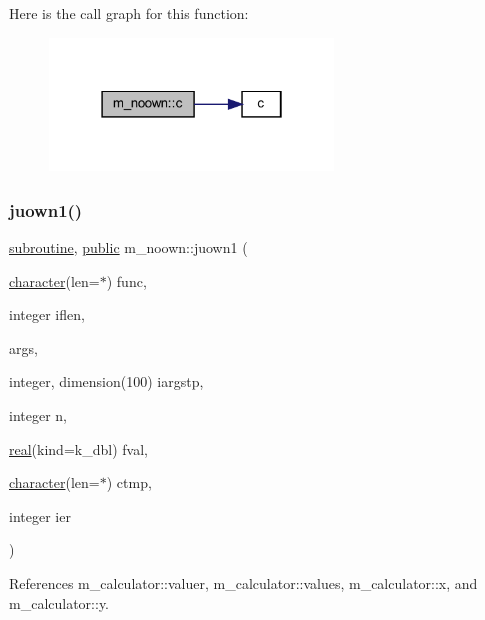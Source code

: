 Here is the call graph for this function\+:
\nopagebreak
\begin{figure}[H]
\begin{center}
\leavevmode
\includegraphics[width=214pt]{namespacem__noown_ad499ba6364622c755e4ad04bc2bfa4a3_cgraph}
\end{center}
\end{figure}
\mbox{\label{namespacem__noown_a9621366886f977a10fd7804c91054c6d}} 
\subsubsection{\texorpdfstring{juown1()}{juown1()}}
{\footnotesize\ttfamily \hyperlink{M__stopwatch_83_8txt_acfbcff50169d691ff02d4a123ed70482}{subroutine}, \hyperlink{M__stopwatch_83_8txt_a2f74811300c361e53b430611a7d1769f}{public} m\+\_\+noown\+::juown1 (\begin{DoxyParamCaption}\item[{\hyperlink{option__stopwatch_83_8txt_abd4b21fbbd175834027b5224bfe97e66}{character}(len=$\ast$)}]{func,  }\item[{integer}]{iflen,  }\item[{}]{args,  }\item[{integer, dimension(100)}]{iargstp,  }\item[{integer}]{n,  }\item[{\hyperlink{read__watch_83_8txt_abdb62bde002f38ef75f810d3a905a823}{real}(kind=k\+\_\+dbl)}]{fval,  }\item[{\hyperlink{option__stopwatch_83_8txt_abd4b21fbbd175834027b5224bfe97e66}{character}(len=$\ast$)}]{ctmp,  }\item[{integer}]{ier }\end{DoxyParamCaption})}



References m\+\_\+calculator\+::valuer, m\+\_\+calculator\+::values, m\+\_\+calculator\+::x, and m\+\_\+calculator\+::y.

